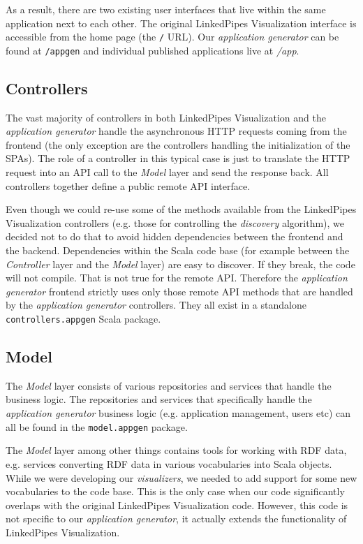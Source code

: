 As a result, there are two existing user interfaces that live within the same application next to each other. The original LinkedPipes Visualization interface is accessible from the home page (the \texttt{/} URL). Our \emph{application generator} can be found at \texttt{/appgen} and individual published applications live at \emph{/app}.

\subsection{Controllers}

The vast majority of controllers in both LinkedPipes Visualization and the \emph{application generator} handle the asynchronous HTTP requests coming from the frontend (the only exception are the controllers handling the initialization of the SPAs). The role of a controller in this typical case is just to translate the HTTP request into an API call to the \emph{Model} layer and send the response back. All controllers together define a public remote API interface.

Even though we could re-use some of the methods available from the LinkedPipes Visualization controllers (e.g. those for controlling the \emph{discovery} algorithm), we decided not to do that to avoid hidden dependencies between the frontend and the backend. Dependencies within the Scala code base (for example between the \emph{Controller} layer and the \emph{Model} layer) are easy to discover. If they break, the code will not compile. That is not true for the remote API. Therefore the \emph{application generator} frontend strictly uses only those remote API methods that are handled by the \emph{application generator} controllers. They all exist in a standalone \texttt{controllers.appgen} Scala package.

\subsection{Model}

The \emph{Model} layer consists of various repositories and services that handle the business logic. The repositories and services that specifically handle the \emph{application generator} business logic (e.g. application management, users etc) can all be found in the \texttt{model.appgen} package.

The \emph{Model} layer among other things contains tools for working with RDF data, e.g. services converting RDF data in various vocabularies into Scala objects. While we were developing our \emph{visualizers}, we needed to add support for some new vocabularies to the code base. This is the only case when our code significantly overlaps with the original LinkedPipes Visualization code. However, this code is not specific to our \emph{application generator}, it actually extends the functionality of LinkedPipes Visualization.

